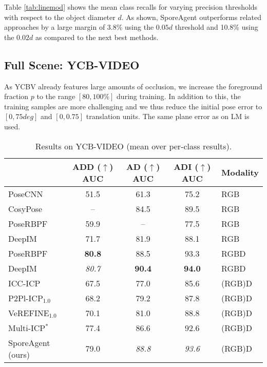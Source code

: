\documentclass[10pt,twocolumn,letterpaper]{article}
\begin{document}
Table \ref{tab:linemod} shows the mean class recalls for varying precision thresholds with respect to the object diameter $d$. As shown, SporeAgent outperforms related approaches by a large margin of 3.8\% using the $0.05d$ threshold and 10.8\% using the $0.02d$ as compared to the next best methods.

\subsection{Full Scene: YCB-VIDEO}
As YCBV already features large amounts of occlusion, we increase the foreground fraction $p$ to the range $[80,100\%]$ during training. In addition to this, the training samples are more challenging and we thus reduce the initial pose error to $[0,75deg]$ and $[0,0.75]$ translation units. The same plane error as on LM is used.

\begin{table}[]
\footnotesize
\setlength\tabcolsep{1.65ex}
    \centering
    \begin{tabular}{l|ccc|l}
         & \makecell{ADD ($\uparrow$)\\AUC} & \makecell{AD ($\uparrow$)\\AUC} & \makecell{ADI ($\uparrow$)\\AUC} & Modality \\\hline
\rowcolor[rgb]{0.95,0.95,0.95}
PoseCNN \cite{xiang2017posecnn}       & 51.5 & 61.3 & 75.2 & RGB \\
CosyPose \cite{labbe2020cosypose}      & --   & 84.5 & 89.5 & RGB \\
PoseRBPF \cite{deng2021poserbpf}      & 59.9 & --   & 77.5 & RGB \\
DeepIM \cite{li2018deepim}        & 71.7 & 81.9 & 88.1 & RGB \\ \hline
PoseRBPF \cite{deng2021poserbpf}      & \textbf{80.8} & 88.5 & 93.3 & RGBD \\
DeepIM \cite{li2018deepim}        & \textit{80.7} & \textbf{90.4} & \textbf{94.0} & RGBD \\ \hline
ICC-ICP \cite{wada2020morefusion}       & 67.5 & 77.0 & 85.6 & (RGB)D \\
P2Pl-ICP$_{1.0}$ \cite{chen1992p2pl,open3d}      & 68.2 & 79.2 & 87.8 & (RGB)D \\
VeREFINE$_{1.0}$ \cite{bauer2020verefine} & 70.1 & 81.0 & 88.8 & (RGB)D \\
Multi-ICP$^*$ \cite{xiang2017posecnn}     & 77.4 & 86.6 & 92.6 & (RGB)D \\
SporeAgent (ours)   & 79.0 & \textit{88.8} & \textit{93.6} & (RGB)D \\
    \end{tabular}\vspace{1ex}
    \caption{Results on YCB-VIDEO (mean over per-class results).
    }
    \label{tab:ycbv}
\end{table}
\end{document}
